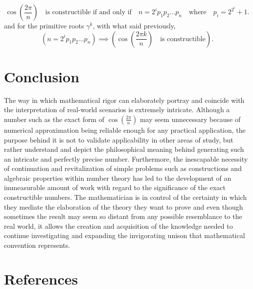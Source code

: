 \documentclass{article}
\begin{document}
$$ \cos(\frac{2\pi}{n}) \quad \textrm{is constructible if and only if} \quad n = 2^i p_1 p_2 ... p_n \quad \textrm{where} \quad p_i = 2^{2^i}+1.$$ and for the primitive roots $\gamma^k$, with what said previously, 
$$(n = 2^i p_1 p_2 ... p_n) \implies (\cos(\frac{2\pi k}{n}) \quad \textrm{is constructible}).$$

\section{Conclusion}
The way in which mathematical rigor can elaborately portray and coincide with the interpretation of real-world scenarios is extremely intricate. Although a number such as the exact form of $ \cos(\frac{2\pi}{n})$ may seem unnecessary because of numerical approximation being reliable enough for any practical application, the purpose behind it is not to validate applicability in other areas of study, but rather understand and depict the philosophical meaning behind generating such an intricate and perfectly precise number. Furthermore, the inescapable necessity of continuation and revitalization of simple problems such as constructions and algebraic properties within number theory has led to the development of an immeasurable amount of work with regard to the significance of the exact constructible numbers. The mathematician is in control of the certainty in which they mediate the elaboration of the theory they want to prove and even though sometimes the result may seem so distant from any possible resemblance to the real world, it allows the creation and acquisition of the knowledge needed to continue investigating and expanding the invigorating unison that mathematical convention represents.
\section{References}

\printbibliography[title = References]
\end{document}
